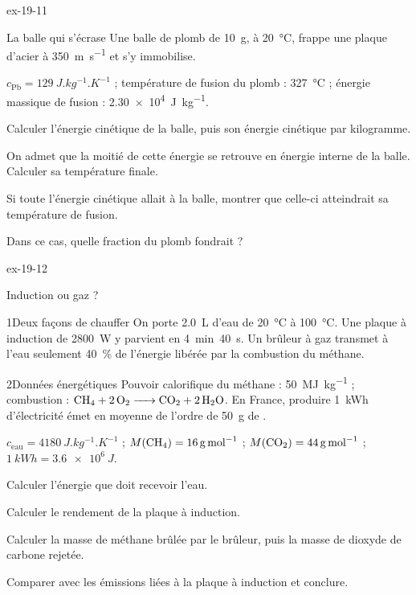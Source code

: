 \begin{blocLivre}{ex-19-11}
\begin{exercice}[2]{La balle qui s'écrase}
Une balle de plomb de \qty{10}{g}, à \qty{20}{\degreeCelsius}, frappe une plaque d'acier à \qty{350}{m.s^{-1}} et s'y immobilise.
\begin{donnees}
$c_\mathrm{Pb}=\qty{129}{J.kg^{-1}.K^{-1}}$ ; température de fusion du plomb : \qty{327}{\degreeCelsius} ; énergie massique de fusion :
\qty{2,30e4}{J.kg^{-1}}.
\end{donnees}
\begin{questions}
\item Calculer l'énergie cinétique de la balle, puis son énergie cinétique par kilogramme.
\item On admet que la moitié de cette énergie se retrouve en énergie interne de la balle. Calculer sa température finale.
\item Si toute l'énergie cinétique allait à la balle, montrer que celle-ci atteindrait sa température de fusion.
\item Dans ce cas, quelle fraction du plomb fondrait ?
\end{questions}
\end{exercice}
\end{blocLivre}
\begin{blocLivre}{ex-19-12}
\begin{exercice}[3]{Induction ou gaz ?}
\begin{docu}{1}{Deux façons de chauffer}
On porte \qty{2,0}{L} d'eau de \qty{20}{\degreeCelsius} à \qty{100}{\degreeCelsius}. Une plaque à induction de \qty{2800}{W} y parvient
en 4~min~40~s. Un brûleur à gaz transmet à l'eau seulement 40~\% de l'énergie libérée par la combustion du méthane.
\end{docu}
\begin{docu}{2}{Données énergétiques}
Pouvoir calorifique du méthane : \qty{50}{MJ.kg^{-1}} ; combustion : $\ce{CH4 + 2 O2 -> CO2 + 2 H2O}$. En France, produire
\qty{1}{kWh} d'électricité émet en moyenne de l'ordre de \qty{50}{g} de .
\end{docu}
\begin{donnees}
$c_\mathrm{eau}=\qty{4180}{J.kg^{-1}.K^{-1}}$ ; $M(\ce{CH4})=\qty{16}{g.mol^{-1}}$ ; $M(\ce{CO2})=\qty{44}{g.mol^{-1}}$ ;
$\qty{1}{kWh}=\qty{3,6e6}{J}$.
\end{donnees}
\begin{questions}
\item Calculer l'énergie que doit recevoir l'eau.
\item Calculer le rendement de la plaque à induction.
\item \initiative Calculer la masse de méthane brûlée par le brûleur, puis la masse de dioxyde de carbone rejetée.
\item Comparer avec les émissions liées à la plaque à induction et conclure.
\end{questions}
\end{exercice}
\end{blocLivre}
